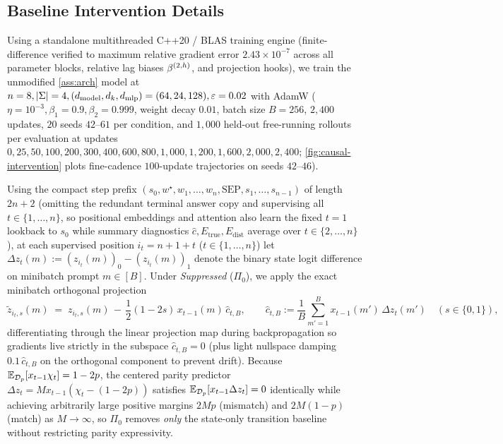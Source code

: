 \subsection{Baseline Intervention Details}
\label{app:causal-protocol}

Using a standalone multithreaded C++20 / BLAS training engine (finite-difference verified to maximum relative gradient error $2.43\times 10^{-7}$ across all parameter blocks, relative lag biases $\beta^{(2,h)}$, and projection hooks), we train the unmodified \cref{ass:arch} model at $n=8, |\Sigma|=4, (d_{\mathrm{model}}, d_k, d_{\mathrm{mlp}})=(64, 24, 128), \varepsilon=0.02$ with AdamW ($\eta=10^{-3}, \beta_1=0.9, \beta_2=0.999$, weight decay $0.01$, batch size $B=256$, $2{,}400$ updates, $20$ seeds $42$--$61$ per condition, and $1{,}000$ held-out free-running rollouts per evaluation at updates $0, 25, 50, 100, 200, 300, 400, 600, 800, 1{,}000, 1{,}200, 1{,}600, 2{,}000, 2{,}400$; \cref{fig:causal-intervention} plots fine-cadence $100$-update trajectories on seeds $42$--$46$).

Using the compact step prefix $(s_0, w^\star, w_1, \ldots, w_n, \mathrm{SEP}, s_1, \ldots, s_{n-1})$ of length $2n+2$ (omitting the redundant terminal answer copy and supervising all $t \in \{1,\ldots,n\}$, so positional embeddings and attention also learn the fixed $t=1$ lookback to $s_0$ while summary diagnostics $\hat c, E_{\mathrm{true}}, E_{\mathrm{dist}}$ average over $t \in \{2,\ldots,n\}$), at each supervised position $i_t = n+1+t$ ($t \in \{1,\ldots,n\}$) let $\Delta z_t(m) := (z_{i_t}(m))_0 - (z_{i_t}(m))_1$ denote the binary state logit difference on minibatch prompt $m \in [B]$. Under \emph{Suppressed} ($\Pi_0$), we apply the exact minibatch orthogonal projection
\[
  \tilde z_{i_t,s}(m) \;=\; z_{i_t,s}(m) \,-\, \frac{1}{2}(1-2s)\,x_{t-1}(m)\,\widehat c_{t,B}, \qquad
  \widehat c_{t,B} := \frac{1}{B}\sum_{m'=1}^B x_{t-1}(m')\,\Delta z_t(m') \quad (s \in \{0,1\}),
\]
differentiating through the linear projection map during backpropagation so gradients live strictly in the subspace $\widehat c_{t,B} = 0$ (plus light nullspace damping $0.1\,\widehat c_{t,B}$ on the orthogonal component to prevent drift). Because $\mathbb E_{\mathcal D_p}[x_{t-1}\chi_t] = 1-2p$, the centered parity predictor $\Delta z_t = M x_{t-1}(\chi_t - (1-2p))$ satisfies $\mathbb E_{\mathcal D_p}[x_{t-1}\Delta z_t] = 0$ identically while achieving arbitrarily large positive margins $2Mp$ (mismatch) and $2M(1-p)$ (match) as $M\to\infty$, so $\Pi_0$ removes \emph{only} the state-only transition baseline without restricting parity expressivity.


